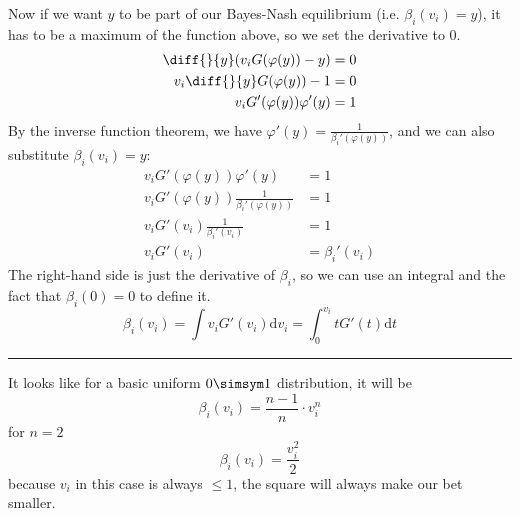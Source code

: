 \documentclass{article}
\let\phi\varphi
\begin{document}
  Now if we want $y$ to be part of our Bayes-Nash equilibrium (i.e. $\beta_i(v_i) = y$), it has to be a maximum of the function above, so we set the derivative to 0.
  \begin{align*}
    \diff{}{y} (v_i G(\phi(y)) - y) &= 0 \\
    v_i \diff{}{y} G(\phi(y)) - 1 &= 0 \\
    v_i G'(\phi(y)) \phi'(y) &= 1
  \end{align*}
  By the inverse function theorem, we have $\phi'(y) = \frac{1}{\beta_i'(\phi(y))}$, and we can also substitute $\beta_i(v_i) = y$:
  \begin{align*}
    v_i G'(\phi(y)) \phi'(y) &= 1 \\
    v_i G'(\phi(y)) \frac{1}{\beta_i'(\phi(y))} &= 1 \\
    v_i G'(v_i) \frac{1}{\beta_i'(v_i)} &= 1 \\
    v_i G'(v_i) &= \beta_i'(v_i)
  \end{align*}
  The right-hand side is just the derivative of $\beta_i$, so we can use an integral and the fact that $\beta_i(0) = 0$ to define it.
  \[
    \beta_i(v_i) = \int v_i G'(v_i) \mathrm{d}v_i = \int_0^{v_i} t G'(t) \mathrm{d}t
  \]

  \noindent\rule{\textwidth}{0.4pt}

  It looks like for a basic uniform $0\simsym 1$ distribution, it will be
  \[ \beta_i(v_i) = \frac{n-1}{n} \cdot v_i^n \]
  for $n=2$
  \[ \beta_i(v_i) = \frac{v_i^2}{2} \]
  because $v_i$ in this case is always $\leq 1$, the square will always make our bet smaller.
\end{document}
